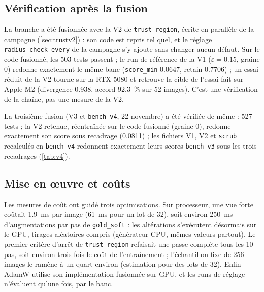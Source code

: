 \documentclass[11pt,a4paper]{article}
\newcommand{\code}[1]{\texttt{#1}}
\begin{document}
\subsection{Vérification après la fusion}\label{sec:fusion}
La branche a été fusionnée avec la V2 de \code{trust\_region}, écrite en parallèle de la campagne
(\cref{sec:trustv2}) : son code est repris tel quel, et le réglage \code{radius\_check\_every} de la
campagne s'y ajoute sans changer aucun défaut. Sur le code fusionné, les 503 tests passent ; le
run de référence de la V1 ($\varepsilon=\num{0.15}$, graine 0) redonne exactement le même banc
(\code{score\_min} \num{0.0647}, retain \num{0.7706}) ; un essai réduit de la V2 tourne sur la RTX
5080 et retrouve la cible de l'essai fait sur Apple M2 (divergence \num{0.938}, accord
\SI{92.3}{\percent} sur 52 images). C'est une vérification de la chaîne, pas une mesure de la V2.

La troisième fusion (V3 et \code{bench-v4}, 22 novembre) a été vérifiée de même : 527 tests ; la V2
retenue, réentraînée sur le code fusionné (graine 0), redonne exactement son score sous recadrage
(\num{0.0811}) ; les fichiers V1, V2 et \code{scrub} recalculés en \code{bench-v4} redonnent
exactement leurs scores \code{bench-v3} sous les trois recadrages (\cref{tab:v4}).

\subsection{Mise en œuvre et coûts}\label{sec:couts}
Les mesures de coût ont guidé trois optimisations. Sur processeur, une vue forte coûtait
\SI{1.9}{\milli\second} par image (\SI{61}{\milli\second} pour un lot de 32), soit environ
\SI{250}{\milli\second} d'augmentations par pas de \code{gold\_soft} : les altérations s'exécutent
désormais sur le GPU, tirages aléatoires compris (générateur CPU, mêmes valeurs partout). Le
premier critère d'arrêt de \code{trust\_region} refaisait une passe complète tous les 10 pas, soit
environ trois fois le coût de l'entraînement ; l'échantillon fixe de 256 images le ramène à un
quart environ (estimation pour des lots de 32). Enfin AdamW utilise son implémentation fusionnée sur
GPU, et les runs de réglage n'évaluent qu'une fois, par le banc.
\end{document}
